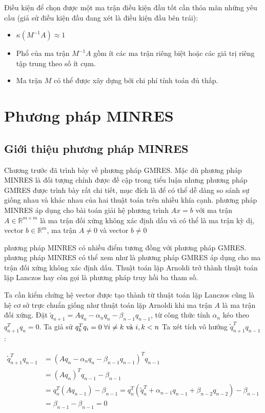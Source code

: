 \documentclass[14pt, a4paper]{article}
\numberwithin{equation}{section}
\numberwithin{algorithm}{section}
\numberwithin{figure}{section}
\numberwithin{dl}{section}
\numberwithin{md}{section}
\numberwithin{bd}{section}
\numberwithin{dn}{section}
\numberwithin{hq}{section}
\begin{document}
Điều kiện để chọn được một ma trận điều kiện đầu tốt cần thỏa mãn những yêu cầu (giả sử điều kiện đầu đang xét là điều kiện đầu bên trái):

\begin{itemize}
    \item $\kappa(M^{-1}A)\approx 1$
    \item Phổ của ma trận $M^{-1}A$ gồm ít các ma trận riêng biệt hoặc các giá trị riêng tập trung theo số ít cụm.
    \item Ma trận $M$ có thể được xây dựng bởi chi phí tính toán đủ thấp.
\end{itemize}

\section{Phương pháp MINRES}

\subsection{Giới thiệu phương pháp MINRES}

Chương trước đã trình bày về phương pháp GMRES. Mặc dù phương pháp MINRES là đối tượng chính được đề cập trong tiểu luận nhưng phương pháp GMRES được trình bày rất chi tiết, mục đích là để có thể dễ dàng so sánh sự giống nhau và khác nhau của hai thuật toán trên nhiều khía cạnh. phương pháp MINRES áp dụng cho bài toán giải hệ phương trình $Ax=b$ với ma trận $A \in \mathbb{R}^{m \times m}$ là ma trận đối xứng không xác định dấu và có thể là ma trận kỳ dị, vector $b \in \mathbb{R}^m$, ma trận $A \neq 0$ và vector $b \neq 0$

phương pháp MINRES có nhiều điểm tương đồng với phương pháp GMRES. phương pháp MINRES có thể xem như là phương pháp GMRES áp dụng cho ma trận đối xứng không xác định dấu.
Thuật toán lặp Arnoldi trở thành thuật toán lặp Lanczos hay còn gọi là phương pháp truy hồi ba tham số.

Ta cần kiểm chứng hệ vector được tạo thành từ thuật toán lặp Lanczos cũng là hệ cơ sở trực chuẩn giống như thuật toán lặp Arnoldi khi ma trận $A$ là ma trận đối xứng. Đặt $\tilde{q}_{n+1}=Aq_{n} - \alpha_n q_n - \beta_{n-1}q_{n-1}$,
từ công thức tính $\alpha_n$ kéo theo $q_{n+1}^T q_n=0$. Ta giả sử $q_k^T q_i =0 \thickspace \forall i \neq k \text{ và } i, k < n$
Ta xét tích vô hướng $\tilde{q}_{n+1}^T q_{n-1}$:

\begin{equation}
    \begin{aligned}
        \tilde{q}_{n+1}^T q_{n-1}&=(Aq_{n} - \alpha_n q_n - \beta_{n-1}q_{n-1})^T q_{n-1} \\
        & = (Aq_{n})^T q_{n-1} - \beta_{n-1}\\
        & =q_{n}^T (Aq_{n-1}) - \beta_{n-1}=q_n^T(\tilde{q}_n^T + \alpha_{n-1}q_{n-1} + \beta_{n-2}q_{n-2})-\beta_{n-1} \\
        &= \beta_{n-1} - \beta_{n-1} = 0
    \end{aligned}
\end{equation}
\end{document}

